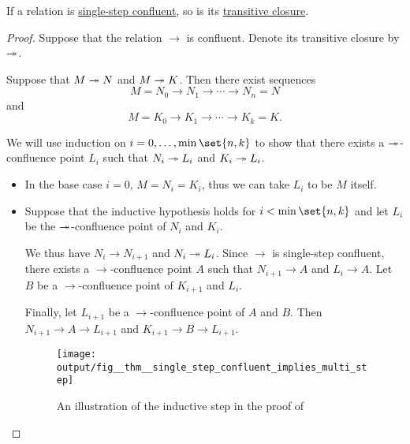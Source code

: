 \begin{proposition}\label{thm:confluence_of_transitive_closure}
  If a relation is \hyperref[def:relation_confluence]{single-step confluent}, so is its \hyperref[def:relation_closures/transitive]{transitive closure}.
\end{proposition}
\begin{proof}
  Suppose that the relation \( {\to} \) is confluent. Denote its transitive closure by \( {\redrel*{}} \).

  Suppose that \( M \redrel*{} N \) and \( M \redrel*{} K \). Then there exist sequences
  \begin{equation*}
    M = N_0 \to N_1 \to \cdots \to N_n = N
  \end{equation*}
  and
  \begin{equation*}
    M = K_0 \to K_1 \to \cdots \to K_k = K.
  \end{equation*}

  We will use induction on \( i = 0, \ldots, \min\set{ n, k } \) to show that there exists a \( {\redrel*{}} \)-confluence point \( L_i \) such that \( N_i \redrel*{} L_i \) and \( K_i \redrel*{} L_i \).

  \begin{itemize}
    \item In the base case \( i = 0 \), \( M = N_i = K_i \), thus we can take \( L_i \) to be \( M \) itself.
    \item Suppose that the inductive hypothesis holds for \( i < \min\set{ n, k } \) and let \( L_i \) be the \( {\redrel*{}} \)-confluence point of \( N_i \) and \( K_i \).

    We thus have \( N_i \to N_{i+1} \) and \( N_i \redrel*{} L_i \). Since \( \to \) is single-step confluent, there exists a \( {\to} \)-confluence point \( A \) such that \( N_{i+1} \to A \) and \( L_i \to A \). Let \( B \) be a \( {\to} \)-confluence point of \( K_{i+1} \) and \( L_i \).

    Finally, let \( L_{i+1} \) be a \( {\to} \)-confluence point of \( A \) and \( B \). Then \( N_{i+1} \to A \to L_{i+1} \) and \( K_{i+1} \to B \to L_{i+1} \).

    \begin{figure}[!ht]
      \centering
      \texttt{[image: output/fig\_\_thm\_\_single\_step\_confluent\_implies\_multi\_step]}
      \caption{An illustration of the inductive step in the proof of }\label{fig:thm:confluence_of_transitive_closure}
    \end{figure}
  \end{itemize}


\end{proof}
